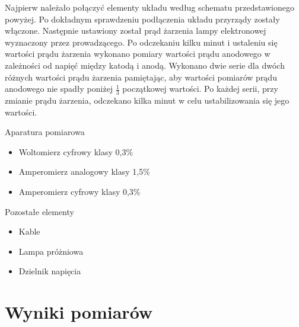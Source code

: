 \documentclass[a4paper,10pt]{article}
\begin{document}
Najpierw należało połączyć elementy układu według schematu przedstawionego powyżej. Po dokładnym sprawdzeniu podłączenia układu przyrządy zostały włączone. Następnie ustawiony został prąd żarzenia lampy elektronowej wyznaczony przez prowadzącego. Po odczekaniu kilku minut i ustaleniu się wartości prądu żarzenia wykonano pomiary wartości prądu anodowego w zależności od napięć między katodą i anodą. Wykonano dwie serie dla dwóch różnych wartości prądu żarzenia pamiętając, aby wartości pomiarów prądu anodowego nie spadły poniżej $\frac{1}{3}$ początkowej wartości. Po każdej serii, przy zmianie prądu żarzenia, odczekano kilka minut w celu ustabilizowania się jego wartości.

\hspace{2in}

Aparatura pomiarowa
\begin{itemize}
  \item Woltomierz cyfrowy klasy 0,3\%
  \item Amperomierz analogowy klasy 1,5\%
  \item Amperomierz cyfrowy klasy 0,3\%
\end{itemize}

\hspace{2in}

Pozostałe elementy
\begin{itemize}
  \item Kable
  \item Lampa próżniowa
  \item Dzielnik napięcia
\end{itemize}

\section{Wyniki pomiarów}
\end{document}
